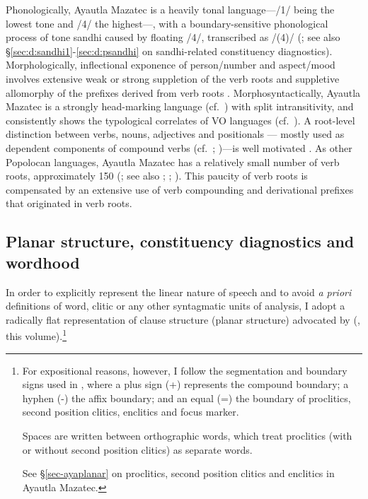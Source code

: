 \documentclass[output=paper]{langscibook}
\begin{document}
Phonologically, Ayautla Mazatec is a heavily tonal language—/1/ being the lowest tone and /4/ the highest—, with a boundary-sensitive phonological process of tone sandhi caused by floating /4/, transcribed as /(4)/ (\citealt[171--196]{nakamoto20}; see also \S\ref{sec:d:sandhi1}-\ref{sec:d:psandhi} on sandhi-related constituency diagnostics).
Morphologically, inflectional exponence of person/number and aspect/mood involves extensive weak or strong suppletion of the verb roots and suppletive allomorphy of the prefixes derived from verb roots \citep[267--319]{nakamoto20}.
Morphosyntactically, Ayautla Mazatec is a strongly head-marking language (cf.~\citealt{nichols86}) with split intransitivity, and consistently shows the typological correlates of VO languages (cf.~\citealt{dryer07}). A root-level distinction between verbs, nouns, adjectives and positionals — mostly used as dependent components of compound verbs (cf.~\citealt{cowancowan47}; \citealt[343]{kalstrometal95})—is well motivated \citep[27--63]{nakamoto20}. As other Popolocan languages, Ayautla Mazatec has a relatively small number of verb roots, approximately 150 (\citealt[267--268]{nakamoto20}; see also \citealt[161]{pikek48}; \citealt[328]{pikee67}; \citealt{austinetal95}). This paucity of verb roots is compensated by an extensive use of verb compounding and derivational prefixes that originated in verb roots.


\subsection{Planar structure, constituency diagnostics and wordhood}\label{sec-in-planar}
In order to explicitly represent the linear nature of speech and to avoid \textit{a priori} definitions of word, clitic or any other syntagmatic units of analysis, I adopt a radically flat representation of clause structure (planar structure) advocated by \citeauthor{tallman20beyond} (\citeyear{tallman20beyond,tallman2021constituency}, this volume).\footnote{For expositional reasons, however, I follow the segmentation and boundary signs used in \citet{nakamoto20}, where a plus sign (+) represents the compound boundary; a hyphen (-) the affix boundary; and an equal (=) the boundary of proclitics, second position clitics, enclitics and focus marker.

Spaces are written between orthographic words, which treat proclitics (with or without second position clitics) as separate words.

See \S\ref{sec-ayaplanar} on proclitics, second position clitics and enclitics in Ayautla Mazatec.} 
\end{document}
